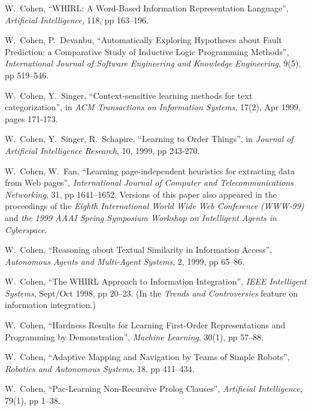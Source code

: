 \item[2000] W.~Cohen, 
	``WHIRL: A Word-Based Information Representation Language'', 	
	{\it Artificial Intelligence}, 118, pp 163--196.

\item[2000] W.~Cohen, P.~Devanbu,
	``Automatically Exploring
	Hypotheses about Fault Prediction: a Comparative Study of Inductive
	Logic Programming Methods'',
	{\it International Journal of
	Software Engineering and Knowledge Engineering},
	9(5), pp 519--546.

\item[1999] W.~Cohen, Y.~Singer,
	``Context-sensitive learning methods for text categorization'',
	in {\it ACM Transactions on Information Systems}, 17(2), Apr 1999,
	pages 171-173.

\item[1999] W.~Cohen, Y.~Singer, R.~Schapire,
	``Learning to Order Things'', 	in
	{\it Journal of Artificial Intelligence Research},
	10, 1999, pp 243-270. 

\item[1999] W.~Cohen, W.~Fan,
	``Learning page-independent heuristics for extracting data
	from Web pages'', {\it International Journal of Computer and
	Telecommunications Networking}, 31, pp 1641--1652. Versions of
	this paper also appeared in the proceedings of 
	the {\em Eighth International World Wide Web Conference
	(WWW-99)} and {\em the 1999 AAAI Spring Symposium Workshop on Intelligent
	Agents in Cyberspace}.

\item[1999] W.~Cohen,
	``Reasoning about Textual Similarity in Information Access'',
	{\it Autonomous Agents and Multi-Agent Systems}, 2, 1999,
	pp 65--86.

\item[1998] W.~Cohen, ``The WHIRL Approach to Information Integration'', 
		{\it IEEE Intelligent Systems}, Sept/Oct 1998, pp 20--23.
		(In the {\em Trends and Controversies\/} feature
		 on information integration.)

\item[1998] W.~Cohen, ``Hardness Results for Learning 
		First-Order Representations and Programming by 
		Demonstration'', {\it Machine Learning}, 30(1),
	        pp 57--88.

\item[1996] W.~Cohen, ``Adaptive Mapping and Navigation by
		Teams of Simple Robots'', {\it Robotics
		and Autonomous Systems}, 18, pp 411--434.

\item[1996] W.~Cohen, ``Pac-Learning Non-Recursive Prolog
		Clauses'', {\it Artificial Intelligence},
		79(1), pp 1--38.

